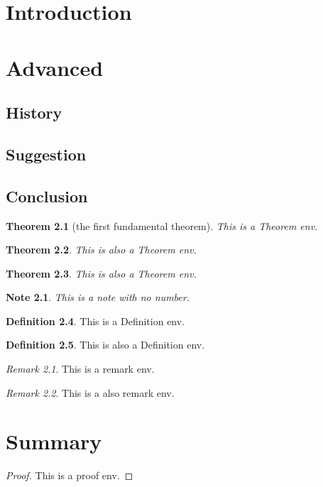 \documentclass[openany]{book}  %
\numberwithin{equation}{section}  %
\theoremstyle{plain}
\newtheorem{thm}{Theorem}[section]
\theoremstyle{definition}
\newtheorem{defn}[thm]{Definition} %
\theoremstyle{remark}
\newtheorem{rmk}{Remark} %
\theoremstyle{plain}
\newtheorem*{nt}{Note} %
\begin{document}
	\chapter{Introduction}
	
	
	\chapter{Advanced}
	\section{History}
	
	\section{Suggestion}
	
	\section{Conclusion}
	\begin{thm}[the first fundamental theorem] %
		This is a Theorem env.
	\end{thm}
	
	\begin{thm}
		This is also a Theorem env.
	\end{thm}

	\begin{thm}
		This is also a Theorem env.
	\end{thm}
	
	\begin{nt}
	This is a note with no number.
	\end{nt}

	\begin{defn}
	This is a Definition env.
	\end{defn}

	\begin{defn}
	This is also a Definition env.
	\end{defn}

	\begin{rmk}
	This is a remark env.
	\end{rmk}

	\begin{rmk}
	This is a also remark env.
	\end{rmk}

	\chapter{Summary}
	\begin{proof}  %
	This is a proof env.	
	\end{proof}
	
\end{document}
